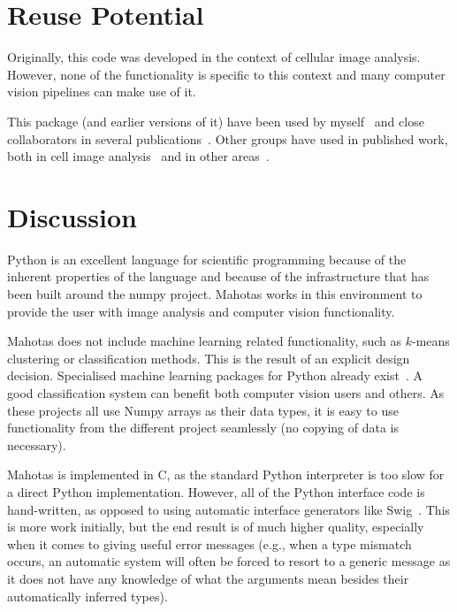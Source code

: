 \documentclass{scrartcl}
\newcommand*{\cpp}{{C\nolinebreak[4]\hspace{-.05em}\raisebox{.4ex}{\tiny\textbf{++}}}}
\begin{document}
\section{Reuse Potential}

Originally, this code was developed in the context of cellular image analysis.
However, none of the functionality is specific to this context and many
computer vision pipelines can make use of it.

This package (and earlier versions of it) have been used by
myself~\citep{Coelho2009,Coelho2010a} and close collaborators in several
publications~\citep{omerosearcher}. Other groups have used in published work,
both in cell image analysis~\citep{CYTO:CYTO22034} and in other
areas~\citep{springerlink:10.1007/978-3-642-32335-5_2}.

\section{Discussion}

Python is an excellent language for scientific programming because of the
inherent properties of the language and because of the infrastructure that has
been built around the numpy project. Mahotas works in this environment to
provide the user with image analysis and computer vision functionality.

Mahotas does not include machine learning related functionality, such as
$k$-means clustering or classification methods. This is the result of an
explicit design decision. Specialised machine learning packages for Python
already
exist~\citep{Pedregosa:2011:SML:2078183.2078195,springerlink:10.1007/978-3-540-30116-5_58,Schaul:2010:PYB:1756006.1756030,Sonnenburg:2010:SML:1756006.1859911}.
A good classification system can benefit both computer vision users
and others. As these projects all use Numpy arrays as their data types, it is
easy to use functionality from the different project seamlessly (no copying of
data is necessary).

Mahotas is implemented in \cpp{}, as the standard Python interpreter is too
slow for a direct Python implementation. However, all of the Python interface
code is hand-written, as opposed to using automatic interface generators like
Swig~\citep{Beazley2003599}. This is more work initially, but the end result is
of much higher quality, especially when it comes to giving useful error
messages (e.g., when a type mismatch occurs, an automatic system will often be
forced to resort to a generic message as it does not have any knowledge of what
the arguments mean besides their automatically inferred types).
\end{document}
